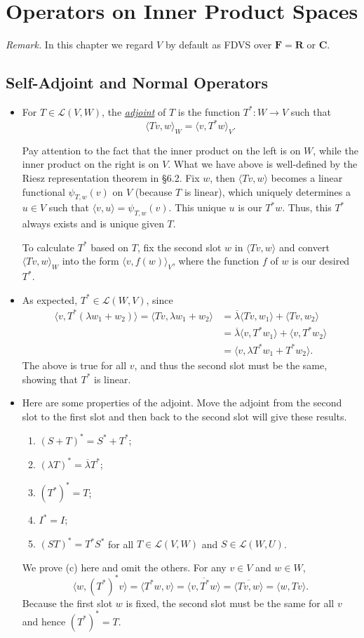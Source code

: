\documentclass{article}
\newcommand{\df}[1]{\ul{\textit{#1}}}
\newcommand{\R}{\mathbf{R}}
\newcommand{\C}{\mathbf{C}}
\newcommand{\F}{\mathbf{F}}
\newcommand{\conj}[1]{\overline{#1}}
\newcommand{\inp}[2]{\langle #1, #2 \rangle}
\newcommand{\LVW}{\mathcal{L}(V,W)}
\begin{document}
\newpage
\section{Operators on Inner Product Spaces}
\textit{Remark.} In this chapter we regard $V$ by default as FDVS over $\F = \R$ or $\C$.
\subsection{Self-Adjoint and Normal Operators}
\begin{itemize}
    \item For $T \in \LVW$, the \df{adjoint} of $T$ is the function $T^*: W \to V$ such that $$\inp{Tv}{w}_W = \inp{v}{T^*w}_V.$$
    
    Pay attention to the fact that the inner product on the left is on $W$, while the inner product on the right is on $V$. What we have above is well-defined by the Riesz representation theorem in \S6.2. Fix $w$, then $\inp{Tv}{w}$ becomes a linear functional $\psi_{T,w}(v)$ on $V$ (because $T$ is linear), which uniquely determines a $u \in V$ such that $\inp{v}{u} = \psi_{T,w}(v)$. This unique $u$ is our $T^*w$. Thus, this $T^*$ always exists and is unique given $T$.
    
    To calculate $T^*$ based on $T$, fix the second slot $w$ in $\inp{Tv}{w}$ and convert $\inp{Tv}{w}_W$ into the form $\inp{v}{f(w)}_V$, where the function $f$ of $w$ is our desired $T^*$.
    \item As expected, $T^* \in \mathcal{L}(W,V)$, since
    \begin{align*}
        \inp{v}{T^*(\lambda w_1 + w_2)} = \inp{Tv}{\lambda w_1 + w_2} & = \conj{\lambda}\inp{Tv}{w_1} + \inp{Tv}{w_2} \\ & = \conj{\lambda}\inp{v}{T^*w_1} + \inp{v}{T^*w_2} \\ & = \inp{v}{\lambda T^* w_1 + T^*w_2}.
    \end{align*}
    The above is true for all $v$, and thus the second slot must be the same, showing that $T^*$ is linear.
    \item Here are some properties of the adjoint. Move the adjoint from the second slot to the first slot and then back to the second slot will give these results.
    \begin{enumerate}[label=(\alph*)]
        \item $(S+T)^* = S^* + T^*$;
        \item $(\lambda T)^* = \conj{\lambda}T^*$;
        \item $(T^*)^* = T$;
        \item $I^* = I$;
        \item $(ST)^* = T^*S^*$ for all $T \in \LVW$ and $S \in \mathcal{L}(W,U)$.
    \end{enumerate}
    We prove (c) here and omit the others. For any $v \in V$ and $w \in W$, $$\inp{w}{(T^*)^*v} = \inp{T^*w}{v} = \conj{\inp{v}{T^*w}} = \conj{\inp{Tv}{w}} = \inp{w}{Tv}.$$ Because the first slot $w$ is fixed, the second slot must be the same for all $v$ and hence $(T^*)^*=T$.
    

\end{itemize}
\end{document}
